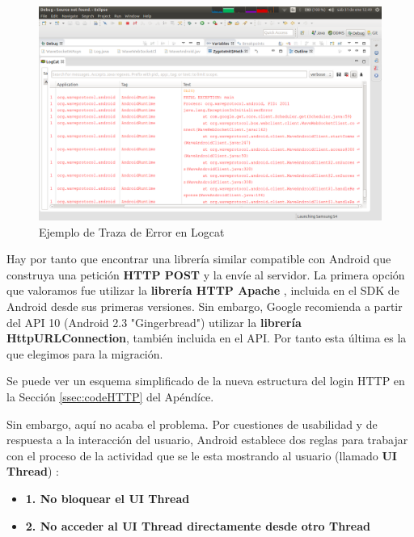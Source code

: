 	\begin{figure}[H]
      \centering
	\includegraphics[keepaspectratio, scale=0.3]{Media/Captures/logcat_example.png}
      \caption{Ejemplo de Traza de Error en Logcat}
      \label{fig:android_logcat}
    \end{figure} 
	 
	 Hay por tanto que encontrar una librería similar compatible con Android que construya una petición \textbf{HTTP POST} y la envíe al servidor. La primera opción que valoramos fue utilizar la \textbf{librería HTTP Apache} \cite{ref:apache_http}, incluida en el SDK de Android desde sus primeras versiones. Sin embargo, Google recomienda \cite{ref:http_recommmendations} a partir del API 10 (Android 2.3 "Gingerbread") utilizar la \textbf{librería HttpURLConnection}\cite{ref:android_httpUrlConnection}, también incluida en el API. Por tanto esta última es la que elegimos para la migración. 
	 
	 Se puede ver un esquema simplificado de la nueva estructura del login HTTP en la Sección \ref{ssec:codeHTTP} del Apéndíce.
	  
	 Sin embargo, aquí no acaba el problema. Por cuestiones de usabilidad y de respuesta a la interacción del usuario, Android establece dos reglas para trabajar con el proceso de la actividad que se le esta mostrando al usuario (llamado \textbf{UI Thread}) \cite{ref:android_processes}:
	  
	  \begin{itemize}
	  	\item \textbf{1. No bloquear el UI Thread}
	  	\item \textbf{2. No acceder al UI Thread directamente desde otro Thread}
	  \end{itemize}
	  

